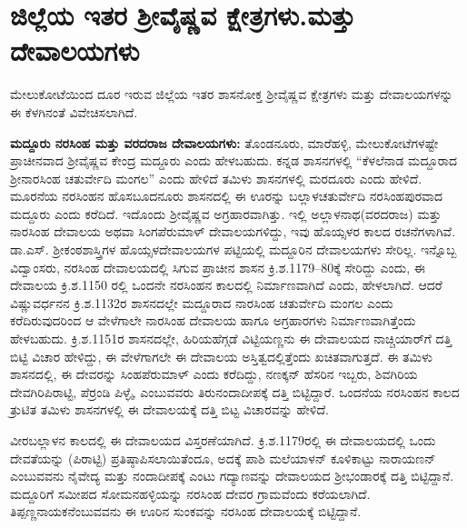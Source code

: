 \section{ಜಿಲ್ಲೆಯ ಇತರ ಶ‍್ರೀವೈಷ್ಣವ ಕ್ಷೇತ್ರಗಳು.ಮತ್ತು ದೇವಾಲಯಗಳು}

ಮೇಲುಕೋಟೆಯಿಂದ ದೂರ ಇರುವ ಜಿಲ್ಲೆಯ ಇತರ ಶಾಸನೋಕ್ತ ಶ‍್ರೀವೈಷ್ಣವ ಕ್ಷೇತ್ರಗಳು ಮತ್ತು ದೇವಾಲಯಗಳನ್ನು ಈ ಕೆಳಗಿನಂತೆ ವಿವೇಚಿಸಲಾಗಿದೆ.

\textbf{ಮದ್ದೂರು ನರಸಿಂಹ ಮತ್ತು ವರದರಾಜ ದೇವಾಲಯಗಳು:} ತೊಂಡನೂರು, ಮಾರೆಹಳ್ಳಿ, ಮೇಲುಕೋಟೆಗಳಷ್ಟೇ ಪ್ರಾಚೀನವಾದ ಶ‍್ರೀವೈಷ್ಣವ ಕೇಂದ್ರ ಮದ್ದೂರು ಎಂದು ಹೇಳಬಹುದು. ಕನ್ನಡ ಶಾಸನಗಳಲ್ಲಿ “ಕೆಳಲೆನಾಡ ಮದ್ದೂರಾದ ಶ‍್ರೀನಾರಸಿಂಹ ಚತುರ್ವೇದಿ ಮಂಗಲ” ಎಂದು ಹೇಳಿದೆ ತಮಿಳು ಶಾಸನಗಳಲ್ಲಿ ಮರದೂರು ಎಂದು ಹೇಳಿದೆ. ಮೂರನೆಯ ನರಸಿಂಹನ ಹೊಸಬೂದನೂರು ಶಾಸನದಲ್ಲಿ ಈ ಊರನ್ನು ಬಲ್ಲಾಳಚತುರ್ವೇದಿ ನರಸಿಂಹಪುರವಾದ ಮದ್ದೂರು ಎಂದು ಕರೆದಿದೆ. ಇದೊಂದು ಶ‍್ರೀವೈಷ್ಣವ ಅಗ್ರಹಾರವಾಗಿತ್ತು. ಇಲ್ಲಿ ಅಲ್ಲಾಳನಾಥ(ವರದರಾಜ) ಮತ್ತು ನಾರಸಿಂಹ ದೇವಾಲಯ ಅಥವಾ ಸಿಂಗಪೆರುಮಾಳ್​ ದೇವಾಲಯಗಳಿದ್ದು, ಇವು ಹೊಯ್ಸಳರ ಕಾಲದ ರಚನೆಗಳಾಗಿವೆ. ಡಾ.ಎಸ್​. ಶ‍್ರೀಕಂಠಶಾಸ್ತ್ರಿಗಳ ಹೊಯ್ಸಳದೇವಾಲಯಗಳ ಪಟ್ಟಿಯಲ್ಲಿ ಮದ್ದೂರಿನ ದೇವಾಲಯಗಳು ಸೇರಿಲ್ಲ. ಇನ್ನೊಬ್ಬ ವಿದ್ವಾಂಸರು, ನರಸಿಂಹ ದೇವಾಲಯದಲ್ಲಿ ಸಿಗುವ ಪ್ರಾಚೀನ ಶಾಸನ ಕ್ರಿ.ಶ.1179–80ಕ್ಕೆ ಸೇರಿದ್ದು ಎಂದು, ಈ ದೇವಾಲಯ ಕ್ರಿ.ಶ.1150 ರಲ್ಲಿ ಒಂದನೇ ನರಸಿಂಹನ ಕಾಲದಲ್ಲಿ ನಿರ್ಮಾಣವಾಗಿದೆ ಎಂದು, ಹೇಳಲಾಗಿದೆ. ಆದರೆ ವಿಷ್ಣುವರ್ಧನನ ಕ್ರಿ.ಶ.1132ರ ಶಾಸನದಲ್ಲೇ ಮದ್ದೂರಾದ ನಾರಸಿಂಹ ಚತುರ್ವೇದಿ ಮಂಗಲ ಎಂದು ಕರೆದಿರುವುದರಿಂದ ಆ ವೇಳೆಗಾಲೇ ನಾರಸಿಂಹ ದೇವಾಲಯ ಹಾಗೂ ಅಗ್ರಹಾರಗಳು ನಿರ್ಮಾಣವಾಗಿತ್ತೆಂದು ಹೇಳಬಹುದು. ಕ್ರಿ.ಶ.1151ರ ಶಾಸನದಲ್ಲೇ, ಹಿರಿಯಹೆಗ್ಗಡೆ ವಿಟ್ಟಿಯಣ್ಣನು ಈ ದೇವಾಲಯದ ನಾಚ್ಚಿಯಾರ್​ಗೆ ದತ್ತಿ ಬಿಟ್ಟಿ ವಿಚಾರ ಹೇಳಿದ್ದು, ಈ ವೇಳೆಗಾಗಲೇ ಈ ದೇವಾಲಯ ಅಸ್ತಿತ್ವದಲ್ಲಿತ್ತೆಂದು ಖಚಿತವಾಗುತ್ತದೆ. ಈ ತಮಿಳು ಶಾಸನದಲ್ಲಿ, ಈ ದೇವರನ್ನು ಸಿಂಹಪೆರುಮಾಳ್​ ಎಂದು ಕರೆದಿದ್ದು, ನಣಕ್ಕನ್​ ಹೆಸರಿನ ಇಬ್ಬರು, ಶಿವಗಿರಿಯ ದೇವಗಿರಿಪಿರಾಟ್ಟಿ, ಪೆರ್ರಂಡಿ ಪಿಳ್ಳೈ, ಎಂಬುವವರು ತಿರುನಂದಾದೀಪಕ್ಕೆ ದತ್ತಿ ಬಿಟ್ಟಿದ್ದಾರೆ. ಒಂದನೆಯ ನರಸಿಂಹನ ಕಾಲದ ತ್ರುಟಿತ ತಮಿಳು ಶಾಸನಗಳಲ್ಲಿ ಈ ದೇವಾಲಯಕ್ಕೆ ದತ್ತಿ ಬಿಟ್ಟ ವಿಚಾರವನ್ನು ಹೇಳಿದೆ.

ವೀರಬಲ್ಲಾಳನ ಕಾಲದಲ್ಲಿ ಈ ದೇವಾಲಯದ ವಿಸ್ತರಣೆಯಾಗಿದೆ. ಕ್ರಿ.ಶ.1179ರಲ್ಲಿ ಈ ದೇವಾಲಯದಲ್ಲಿ ಒಂದು ದೇವತೆಯನ್ನು (ಪಿರಾಟ್ಟಿ) ಪ್ರತಿಷ್ಠಾಪಿಸಲಾಯಿತೆಂದೂ, ಅದಕ್ಕೆ ಪಾಶಿ ಮಲೆಯಾಳನ್​ ಕೂಳಿಕಾಟ್ಟು ನಾರಾಯಣನ್​ ಎಂಬುವವನು ನೈವೇದ್ಯ ಮತ್ತು ನಂದಾದೀಪಕ್ಕೆ ಎಂಟು ಗದ್ಯಾಣವನ್ನು ದೇವಾಲಯದ ಶ‍್ರೀಭಂಡಾರಕ್ಕೆ ದತ್ತಿ ಬಿಟ್ಟಿದ್ದಾನೆ. ಮದ್ದೂರಿಗೆ ಸಮೀಪದ ಸೋಮನಹಳ್ಳಿಯನ್ನು ನರಸಿಂಹ ದೇವರ ಗ್ರಾಮವೆಂದು ಕರೆಯಲಾಗಿದೆ. ತಿಪ್ಪಣ್ಣನಾಯಕನೆಂಬುವವನು ಈ ಊರಿನ ಸುಂಕವನ್ನು ನರಸಿಂಹ ದೇವಾಲಯಕ್ಕೆ ಬಿಟ್ಟಿದ್ದಾನೆ.


